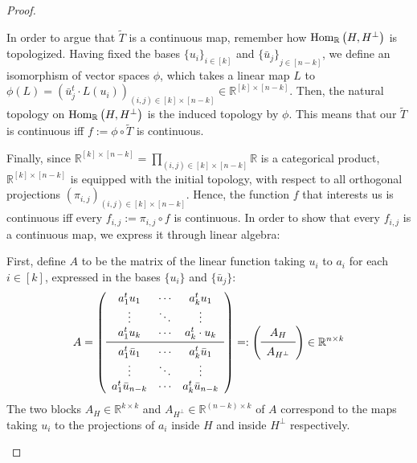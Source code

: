 \begin{proof}
\begin{b_item}
In order to argue that $\tilde T$ is a continuous map, remember how $\mathrm{Hom}_{\mathbb{R}}\left(H,H^{\perp}\right)$ is topologized.
Having fixed the bases ${\{u_i\}}_{i\in[k]}$ and ${\{\bar{u}_j\}}_{j\in[n-k]}$, we define an isomorphism of vector spaces $\phi$, which takes a linear map $L$ to
$\phi(L)={\left(\bar{u}_j^t\cdot L(u_i)\right)}_{(i,j)\in[k]\times[n-k]}\in\mathbb{R}^{[k]\times[n-k]}$.
Then, the natural topology on $\mathrm{Hom}_{\mathbb{R}}\left(H,H^{\perp}\right)$ is the induced topology by $\phi$. This means that our $\tilde T$ is continuous iff $f:=\phi\circ\tilde T$ is continuous.

Finally, since $\mathbb{R}^{[k]\times[n-k]}=\prod_{(i,j)\in[k]\times[n-k]}\mathbb{R}$ is a categorical product, $\mathbb{R}^{[k]\times[n-k]}$ is equipped with the initial topology, with respect to all orthogonal projections ${\left(\pi_{i,j}\right)}_{(i,j)\in[k]\times[n-k]}$. Hence, the function $f$ that interests us is continuous iff every $f_{i,j}:=\pi_{i,j}\circ f$ is continuous. In order to show that every $f_{i,j}$ is a continuous map, we express it through linear algebra:

First, define $A$ to be the matrix of the linear function taking $u_i$ to $a_i$ for each $i\in[k]$, expressed in the bases $\{u_i\}$ and $\{\bar{u}_j\}$:
\[A=\left(\begin{array}{ccc}
a^t_1u_1&\cdots&a^t_ku_1\\
\vdots&\ddots&\vdots\\
a^t_1u_k&\cdots&a^t_k\cdot u_k\\
\midrule
a^t_1\bar{u}_1&\cdots&a^t_k\bar{u}_1\\
\vdots&\ddots&\vdots\\
a^t_1\bar{u}_{n-k}&\cdots&a^t_k\bar{u}_{n-k}\\
\end{array}\right)=:
\left(\begin{array}{c}A_H\\\midrule A_{H^{\perp}}\\
\end{array}\right)
\in\mathbb{R}^{n\times{k}}\]
The two blocks $A_H\in\mathbb{R}^{k\times k}$ and $A_{H^{\perp}}\in\mathbb{R}^{(n-k)\times k}$ of $A$ correspond to the maps taking $u_i$ to the projections of $a_i$ inside $H$ and inside $H^{\perp}$ respectively.


\end{b_item}
\end{proof}
